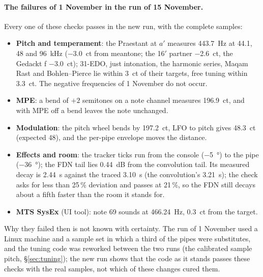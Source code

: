 \documentclass[11pt,a4paper,parskip=half,DIV=11,toc=bibliography]{scrartcl}
\begin{document}
\paragraph{The failures of 1 November in the run of 15 November.} Every one of these checks passes in the new run, with the complete samples:
\begin{itemize}
  \item \textbf{Pitch and temperament}: the Praestant at $a'$ measures \SI{443.7}{Hz} at 44.1, 48 and \SI{96}{kHz} (\SI{-3.0}{ct} from meantone; the
        16$'$ partner \SI{-2.6}{ct}, the Gedackt f \SI{-3.0}{ct}); 31-EDO, just intonation, the harmonic series, Maqam Rast and Bohlen--Pierce lie within
        \SI{3}{ct} of their targets, free tuning within \SI{3.3}{ct}. The negative frequencies of 1 November do not occur.
  \item \textbf{MPE}: a bend of $+2$ semitones on a note channel measures \SI{196.9}{ct}, and with MPE off a bend leaves the note unchanged.
  \item \textbf{Modulation}: the pitch wheel bends by \SI{197.2}{ct}, LFO to pitch gives \SI{48.3}{ct} (expected 48), and the per-pipe envelope
        moves the distance.
  \item \textbf{Effects and room}: the tracker ticks run from the console (\SI{-5}{\degree}) to the pipe (\SI{-36}{\degree}); the FDN tail lies
        \SI{0.44}{dB} from the convolution tail. Its measured decay is \SI{2.44}{s} against the traced \SI{3.10}{s} (the convolution's
        \SI{3.21}{s}); the check asks for less than 25\,\% deviation and passes at 21\,\%, so the FDN still decays about a fifth faster than the room
        it stands for.
  \item \textbf{MTS SysEx} (UI tool): note 69 sounds at \SI{466.24}{Hz}, \SI{0.3}{ct} from the target.
\end{itemize}
Why they failed then is not known with certainty. The run of 1 November used a Linux machine and a sample set in which a third of the pipes were
substitutes, and the tuning code was reworked between the two runs (the calibrated sample pitch, \S\ref{sec:tuning}); the new run shows that the
code as it stands passes these checks with the real samples, not which of these changes cured them.
\end{document}
